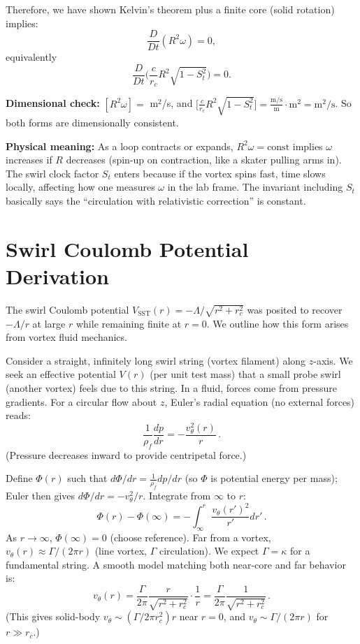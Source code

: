 \documentclass[10pt,reprint,aps,onecolumn,nofootinbib]{revtex4-2}
\begin{document}
	Therefore, we have shown Kelvin’s theorem plus a finite core (solid rotation) implies:
	\[
		\frac{D}{Dt}(R^2 \omega) = 0,
	\]
	equivalently
	\[
		\frac{D}{Dt}\Big(\frac{c}{r_c}R^2\sqrt{1 - S_t^2}\Big) = 0.
	\]

	\noindent\textbf{Dimensional check:} $[R^2 \omega] =$ m$^2$/s, and
	$\big[\frac{c}{r_c}R^2\sqrt{1 - S_t^2}\big] = \frac{\text{m/s}}{\text{m}} \cdot \text{m}^2 = \text{m}^2/\text{s}$. So both forms are dimensionally consistent.

	\noindent\textbf{Physical meaning:} As a loop contracts or expands, $R^2 \omega = \text{const}$ implies $\omega$ increases if $R$ decreases (spin-up on contraction, like a skater pulling arms in). The swirl clock factor $S_t$ enters because if the vortex spins fast, time slows locally, affecting how one measures $\omega$ in the lab frame. The invariant including $S_t$ basically says the “circulation with relativistic correction” is constant.

	\section{Swirl Coulomb Potential Derivation}
	The swirl Coulomb potential $V_{\text{SST}}(r) = -\Lambda/\sqrt{r^2+r_c^2}$ was posited to recover $- \Lambda/r$ at large $r$ while remaining finite at $r=0$. We outline how this form arises from vortex fluid mechanics.

	Consider a straight, infinitely long swirl string (vortex filament) along $z$-axis. We seek an effective potential $V(r)$ (per unit test mass) that a small probe swirl (another vortex) feels due to this string. In a fluid, forces come from pressure gradients. For a circular flow about $z$, Euler’s radial equation (no external forces) reads:
	\[
		\frac{1}{\rho_f}\frac{dp}{dr} = -\frac{v_{\theta}^2(r)}{r}\,.
	\]
	(Pressure decreases inward to provide centripetal force.)

	Define $\Phi(r)$ such that $d\Phi/dr = \frac{1}{\rho_f}dp/dr$ (so $\Phi$ is potential energy per mass); Euler then gives $d\Phi/dr = -v_{\theta}^2/r$. Integrate from $\infty$ to $r$:
	\[
		\Phi(r) - \Phi(\infty) = -\int_{\infty}^{r} \frac{v_{\theta}(r')^2}{r'} dr'\,.
	\]
	As $r\to\infty$, $\Phi(\infty)=0$ (choose reference). Far from a vortex, $v_{\theta}(r) \approx \Gamma/(2\pi r)$ (line vortex, $\Gamma$ circulation). We expect $\Gamma = \kappa$ for a fundamental string. A smooth model matching both near-core and far behavior is:
	\[
		v_{\theta}(r) = \frac{\Gamma}{2\pi}\frac{r}{\sqrt{r^2+r_c^2}}\cdot\frac{1}{r} = \frac{\Gamma}{2\pi}\frac{1}{\sqrt{r^2+r_c^2}}\,.
	\]
	(This gives solid-body $v_{\theta}\sim (\Gamma/2\pi r_c^2)r$ near $r=0$, and $v_{\theta}\sim \Gamma/(2\pi r)$ for $r\gg r_c$.)
\end{document}
